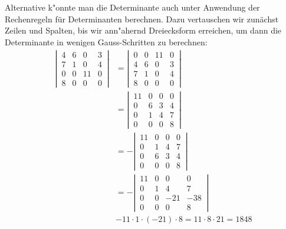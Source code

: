 {\begin{loesung}
Alternative k"onnte man die Determinante auch unter Anwendung der
Rechenregeln f\"ur Determinanten berechnen. Dazu vertauschen wir
zun\"achst Zeilen und Spalten, bis wir ann"ahernd Dreiecksform erreichen,
um dann die Determinante in wenigen Gauss-Schritten zu berechnen:
\begin{align*}
\left|\,\begin{matrix}
4&6& 0&3\\
7&1& 0&4\\
0&0&11&0\\
8&0& 0&0
\end{matrix}\,\right|
&=
\left|\,\begin{matrix}
0&0&11&0\\
4&6& 0&3\\
7&1& 0&4\\
8&0& 0&0
\end{matrix}\,\right|
\\
&=
\left|\,\begin{matrix}
11&0&0&0\\
 0&6&3&4\\
 0&1&4&7\\
 0&0&0&8
\end{matrix}\,\right|\\
&=
-\left|\,\begin{matrix}
11&0&0&0\\
 0&1&4&7\\
 0&6&3&4\\
 0&0&0&8
\end{matrix}\,\right|\\
&=
-\left|\,\begin{matrix}
11&0&  0&  0\\
 0&1&  4&  7\\
 0&0&-21&-38\\
 0&0&  0&  8
\end{matrix}\,\right|\\
&-11\cdot 1\cdot (-21)\cdot 8=11\cdot 8\cdot 21=1848
\end{align*}
\end{loesung}
}{
}


